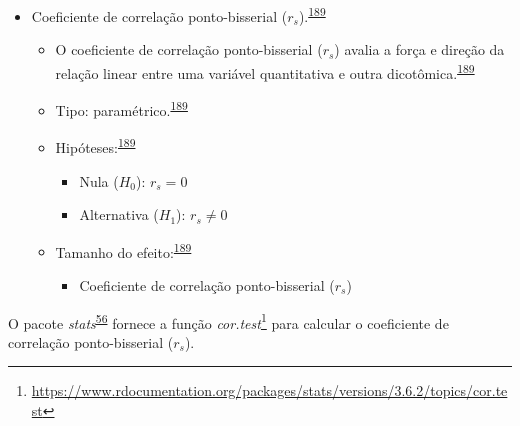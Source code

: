 \documentclass[
  a4paper,
]{book}
\providecommand{\tightlist}{%
  \setlength{\itemsep}{0pt}\setlength{\parskip}{0pt}}
\renewcommand{\href}[2]{#2\footnote{\url{#1}}}
\newenvironment{infobox}[1]
  {
  \begin{itemize}
  \renewcommand{\labelitemi}{
    \raisebox{-.7\height}[0pt][0pt]{
      {\setkeys{Gin}{width=3em,keepaspectratio}
        \texttt{[image: \#1]}}
    }
  }
  \setlength{\fboxsep}{1em}
  \begin{blackbox}
  \item
  }
  {
  \end{blackbox}
  \end{itemize}
  }
\begin{document}
\begin{itemize}
\item
  Coeficiente de correlação ponto-bisserial (\(r_{s}\)).\textsuperscript{\protect\hyperlink{ref-khamis2008}{189}}

  \begin{itemize}
  \item
    O coeficiente de correlação ponto-bisserial (\(r_{s}\)) avalia a força e direção da relação linear entre uma variável quantitativa e outra dicotômica.\textsuperscript{\protect\hyperlink{ref-khamis2008}{189}}
  \item
    Tipo: paramétrico.\textsuperscript{\protect\hyperlink{ref-khamis2008}{189}}
  \item
    Hipóteses:\textsuperscript{\protect\hyperlink{ref-khamis2008}{189}}

    \begin{itemize}
    \item
      Nula (\(H_{0}\)): \(r_{s}=0\)
    \item
      Alternativa (\(H_{1}\)): \(r_{s}≠0\)
    \end{itemize}
  \item
    Tamanho do efeito:\textsuperscript{\protect\hyperlink{ref-khamis2008}{189}}

    \begin{itemize}
    \tightlist
    \item
      Coeficiente de correlação ponto-bisserial (\(r_{s}\))
    \end{itemize}
  \end{itemize}
\end{itemize}

\begin{infobox}{images/Rlogo}
O pacote \emph{stats}\textsuperscript{\protect\hyperlink{ref-stats-2}{56}} fornece a função \href{https://www.rdocumentation.org/packages/stats/versions/3.6.2/topics/cor.test}{\emph{cor.test}} para calcular o coeficiente de correlação ponto-bisserial (\(r_{s}\)).

\end{infobox}
\end{document}
